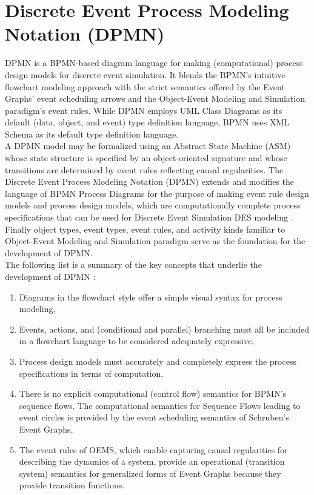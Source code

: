 \documentclass{article}
\begin{document}
\section{Discrete Event Process Modeling Notation (DPMN)}

DPMN is a BPMN-based diagram language for making (computational) process design models for discrete event simulation. It blends the BPMN's intuitive flowchart modeling approach with the strict semantics offered by the Event Graphs' event scheduling arrows and the Object-Event Modeling and Simulation paradigm's event rules. While DPMN employs UML Class Diagrams as its default (data, object, and event) type definition language, BPMN uses XML Schema as its default type definition language. \\ 
A DPMN model may be formalized using an Abstract State Machine (ASM) whose state structure is specified by an object-oriented signature and whose transitions are determined by event rules reflecting causal regularities. The Discrete Event Process Modeling Notation (DPMN) extends and modifies the language of BPMN Process Diagrams for the purpose of making event rule design models and process design models, which are computationally complete process specifications that can be used for Discrete Event Simulation DES modeling \cite{Wagner}. Finally object types, event types, event rules, and activity kinds familiar to Object-Event Modeling and Simulation paradigm serve as the foundation for the development of DPMN.\\
The following list is a summary of the key concepts that underlie the development of DPMN \cite{Wagner}:
\begin{enumerate}
\item Diagrams in the flowchart style offer a simple visual syntax for process modeling,
\item Events, actions, and (conditional and parallel) branching must all be included in a flowchart language to be considered adequately expressive,
\item Process design models must accurately and completely express the process specifications in terms of computation,
\item There is no explicit computational (control flow) semantics for BPMN's sequence flows. The computational semantics for Sequence Flows leading to event circles is provided by the event scheduling semantics of Schruben's Event Graphs,
\item The event rules of OEMS, which enable capturing causal regularities for describing the dynamics of a system, provide an operational (transition system) semantics for generalized forms of Event Graphs because they provide transition functions.
\end{enumerate}
\end{document}
